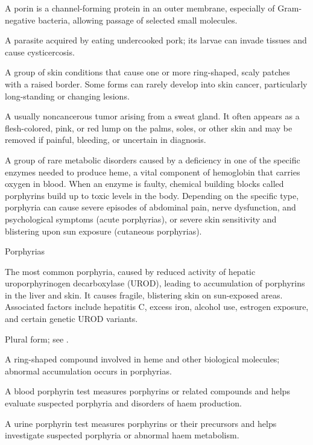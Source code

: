  A porin is a channel-forming protein in an outer membrane, especially of Gram-negative bacteria, allowing passage of selected small molecules.

 A parasite acquired by eating undercooked pork; its larvae can invade tissues and cause cysticercosis.

 A group of skin conditions that cause one or more ring-shaped, scaly patches with a raised border. Some forms can rarely develop into skin cancer, particularly long-standing or changing lesions.

 A usually noncancerous tumor arising from a sweat gland. It often appears as a flesh-colored, pink, or red lump on the palms, soles, or other skin and may be removed if painful, bleeding, or uncertain in diagnosis.

 A group of rare metabolic disorders caused by a deficiency in one of the specific enzymes needed to produce heme, a vital component of hemoglobin that carries oxygen in blood. When an enzyme is faulty, chemical building blocks called porphyrins build up to toxic levels in the body. Depending on the specific type, porphyria can cause severe episodes of abdominal pain, nerve dysfunction, and psychological symptoms (acute porphyrias), or severe skin sensitivity and blistering upon sun exposure (cutaneous porphyrias).

\synonyms
Porphyrias

 The most common porphyria, caused by reduced activity of hepatic uroporphyrinogen decarboxylase (UROD), leading to accumulation of porphyrins in the liver and skin. It causes fragile, blistering skin on sun-exposed areas. Associated factors include hepatitis C, excess iron, alcohol use, estrogen exposure, and certain genetic UROD variants.

 Plural form; see .

 A ring-shaped compound involved in heme and other biological molecules; abnormal accumulation occurs in porphyrias.

 A blood porphyrin test measures porphyrins or related compounds and helps evaluate suspected porphyria and disorders of haem production.

 A urine porphyrin test measures porphyrins or their precursors and helps investigate suspected porphyria or abnormal haem metabolism.

